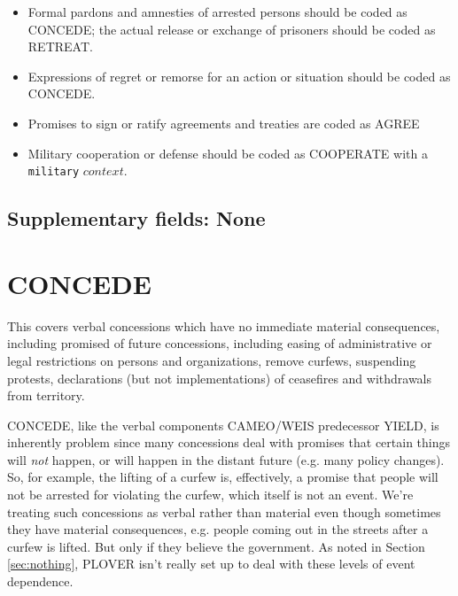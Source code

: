 \documentclass[11pt]{report}
\newcommand{\plcat}[1]{\textsf{#1}}
\newcommand{\ti}[1]{\textit{#1}}
\newcommand{\txt}[1]{\texttt{#1}}
\begin{document}
\begin{itemize}
\item Formal pardons and amnesties of arrested persons should be coded as \plcat{CONCEDE}; the actual release  or exchange of prisoners should be coded as \plcat{RETREAT}.

\item Expressions of regret or remorse for an action or situation should be coded as \plcat{CONCEDE}.

\item Promises to sign or ratify agreements and treaties are coded as \plcat{AGREE}

\item Military cooperation or defense should be coded as \plcat{COOPERATE} with a \txt{military} $context.$
\end{itemize}

\subsection{Supplementary fields: None}

\newpage

\section{CONCEDE}

This covers verbal concessions which have no immediate material consequences, including promised of future concessions, including easing of administrative or legal restrictions on persons and organizations, remove curfews, suspending protests, declarations (but not implementations) of ceasefires and withdrawals from territory.

\plcat{CONCEDE}, like the verbal components CAMEO/WEIS predecessor \plcat{YIELD}, is inherently problem since many concessions deal with promises that certain things will \ti{not} happen, or will happen in the distant future (e.g. many policy changes). So, for example, the lifting of a curfew is, effectively, a promise that people will not be arrested for violating the curfew, which itself is not an event. We're treating such concessions as verbal rather than material even though sometimes they have material consequences, e.g. people coming out in the streets after a curfew is lifted. But only if they believe the government. As noted in Section \ref{sec:nothing}, PLOVER isn't really set up to deal with these levels of event dependence. 
\end{document}
